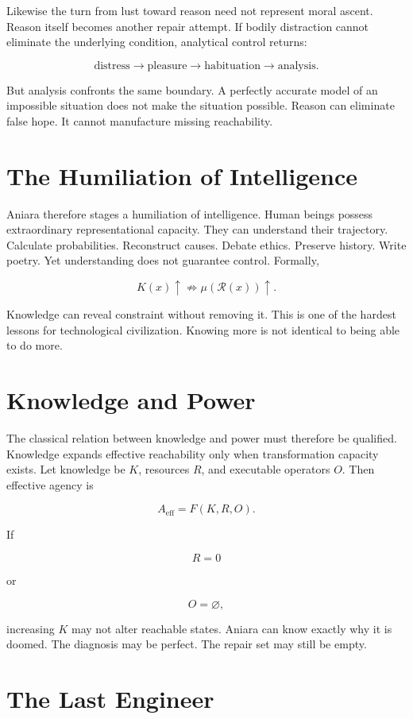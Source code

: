 \documentclass[11pt,oneside]{book}
\theoremstyle{definition}
\theoremstyle{remark}
\newcommand{\R}{\mathcal{R}}
\begin{document}
Likewise the turn from lust toward reason need not represent moral ascent. Reason itself becomes
another repair attempt. If bodily distraction cannot eliminate the underlying condition, analytical
control returns:

\[
\text{distress} \rightarrow \text{pleasure} \rightarrow \text{habituation} \rightarrow \text{analysis}.
\]

But analysis confronts the same boundary. A perfectly accurate model of an impossible situation does
not make the situation possible. Reason can eliminate false hope. It cannot manufacture missing
reachability.

\section{The Humiliation of Intelligence}

Aniara therefore stages a humiliation of intelligence. Human beings possess extraordinary
representational capacity. They can understand their trajectory. Calculate probabilities.
Reconstruct causes. Debate ethics. Preserve history. Write poetry. Yet understanding does not
guarantee control. Formally,

\[
K(x)\uparrow \not\Rightarrow \mu(\R(x))\uparrow.
\]

Knowledge can reveal constraint without removing it. This is one of the hardest lessons for
technological civilization. Knowing more is not identical to being able to do more.

\section{Knowledge and Power}

The classical relation between knowledge and power must therefore be qualified. Knowledge expands
effective reachability only when transformation capacity exists. Let knowledge be \(K\), resources
\(R\), and executable operators \(O\). Then effective agency is

\[
A_{\mathrm{eff}} = F(K,R,O).
\]

If

\[
R=0
\]

or

\[
O=\varnothing,
\]

increasing \(K\) may not alter reachable states. Aniara can know exactly why it is doomed. The
diagnosis may be perfect. The repair set may still be empty.

\section{The Last Engineer}
\end{document}

